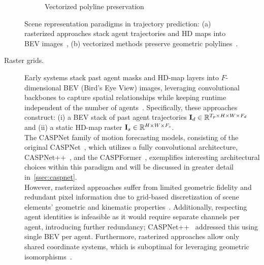 \begin{figure}[H]
\begin{subfigure}[t]{0.37\textwidth}
    \caption{Vectorized polyline preservation}
    \label{fig:vectorized}
\end{subfigure}
\caption{Scene representation paradigms in trajectory prediction: (a) rasterized approaches stack agent trajectories and HD maps into BEV images~\cite{caspnetSchäfer2022}, (b) vectorized methods preserve geometric polylines~\cite{gao2020vectornet}.}
\label{fig:scene_representations}
\end{figure}


\begin{description}
\item[Raster grids.] Early systems stack past agent masks and HD-map layers into \( F \)-dimensional BEV (Bird's Eye View) images, leveraging convolutional backbones to capture spatial relationships while keeping runtime independent of the number of agents~\cite{cui2019multimodal,chai2019multipath}. Specifically, these approaches construct: (i) a BEV stack of past agent trajectories \( \mathbf{I}_d\in\mathbb{R}^{T_p\times H\times W\times F_d} \) and (ii) a static HD-map raster \( \mathbf{I}_s\in\mathbb{R}^{H\times W\times F_s} \).\\
The CASPNet family of motion forecasting models, consisting of the original CASPNet~\cite{caspnetSchäfer2022}, which utilizes a fully convolutional architecture, CASPNet++~\cite{caspnetppSchäfer2023}, and the CASPFormer~\cite{caspformerYadav2024}, exemplifies interesting architectural choices within this paradigm and will be discussed in greater detail in~\autoref{ssec:caspnet}.\\
However, rasterized approaches suffer from limited geometric fidelity and redundant pixel information due to grid-based discretization of scene elements' geometric and kinematic properties~\cite{lmformerYadav2025}. Additionally, respecting agent identities is infeasible as it would require separate channels per agent, introducing further redundancy; CASPNet++~\cite{caspnetppSchäfer2023} addressed this using single BEV per agent. Furthermore, rasterized approaches allow only shared coordinate systems, which is suboptimal for leveraging geometric isomorphisms~\cite{qcnetZhou2023}. %


\end{description}
